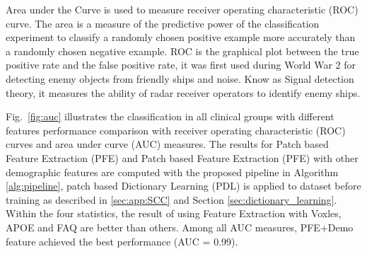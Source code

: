 \documentclass[authoryear,preprint,revi	ew,12pt]{elsarticle}
\newcommand{\Sec}[1]  {Section \ref{sec:#1}}
\begin{document}
Area under the Curve is used to measure receiver operating characteristic (ROC) curve. The area is a measure of the predictive power of the classification experiment to classify a  randomly chosen positive example more accurately than a randomly chosen negative example. ROC is the graphical plot between the true positive rate and the false positive rate, it was first used during World War 2 for detecting enemy objects from friendly ships and noise. Know as Signal detection theory, it measures the ability of radar receiver operators to identify enemy ships.

Fig.~\ref{fig:auc} illustrates the classification in all clinical groups with different features performance comparison with receiver operating characteristic (ROC) curves and area under curve (AUC) measures. The results for Patch based Feature Extraction (PFE) and Patch based Feature Extraction (PFE)  with other demographic features are computed with the proposed pipeline in Algorithm \ref{alg:pipeline}, patch based Dictionary Learning (PDL) is applied to dataset before training as described in \ref{sec:app:SCC} and \Sec{dictionary_learning}. Within the four statistics, the result of using Feature Extraction with Voxles, APOE and FAQ are better than others. Among all AUC measures, PFE+Demo feature achieved the best performance (AUC = 0.99).
	
\end{document}

